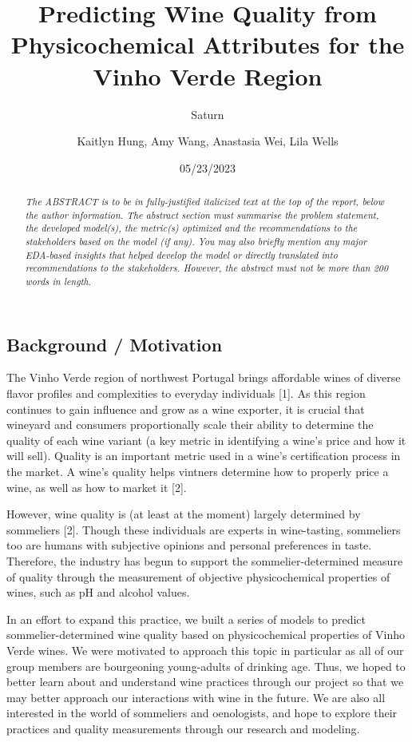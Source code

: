 \documentclass[
  letterpaper,
  DIV=11,
  numbers=noendperiod]{scrartcl}
\title{Predicting Wine Quality from Physicochemical Attributes for the
Vinho Verde Region}
\subtitle{Saturn}
\author{Kaitlyn Hung, Amy Wang, Anastasia Wei, Lila Wells}
\date{05/23/2023}
\begin{document}
\maketitle
\begin{abstract}
\emph{The ABSTRACT is to be in fully-justified italicized text at the
top of the report, below the author information. The abstract section
must summarise the problem statement, the developed model(s), the
metric(s) optimized and the recommendations to the stakeholders based on
the model (if any). You may also briefly mention any major EDA-based
insights that helped develop the model or directly translated into
recommendations to the stakeholders. However, the abstract must not be
more than 200 words in length}.
\end{abstract}
\ifdefined\Shaded\renewenvironment{Shaded}{\begin{tcolorbox}[sharp corners, enhanced, boxrule=0pt, interior hidden, borderline west={3pt}{0pt}{shadecolor}, frame hidden, breakable]}{\end{tcolorbox}}\fi

\hypertarget{background-motivation}{%
\subsection{Background / Motivation}\label{background-motivation}}

The Vinho Verde region of northwest Portugal brings affordable wines of
diverse flavor profiles and complexities to everyday individuals
{[}1{]}. As this region continues to gain influence and grow as a wine
exporter, it is crucial that wineyard and consumers proportionally scale
their ability to determine the quality of each wine variant (a key
metric in identifying a wine's price and how it will sell). Quality is
an important metric used in a wine's certification process in the
market. A wine's quality helps vintners determine how to properly price
a wine, as well as how to market it {[}2{]}.

However, wine quality is (at least at the moment) largely determined by
sommeliers {[}2{]}. Though these individuals are experts in
wine-tasting, sommeliers too are humans with subjective opinions and
personal preferences in taste. Therefore, the industry has begun to
support the sommelier-determined measure of quality through the
measurement of objective physicochemical properties of wines, such as pH
and alcohol values.

In an effort to expand this practice, we built a series of models to
predict sommelier-determined wine quality based on physicochemical
properties of Vinho Verde wines. We were motivated to approach this
topic in particular as all of our group members are bourgeoning
young-adults of drinking age. Thus, we hoped to better learn about and
understand wine practices through our project so that we may better
approach our interactions with wine in the future. We are also all
interested in the world of sommeliers and oenologists, and hope to
explore their practices and quality measurements through our research
and modeling.
\end{document}
